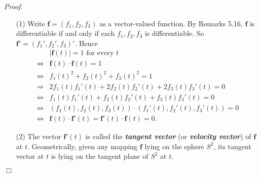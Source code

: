 \documentclass{article}
\begin{document}
\emph{Proof.}
\begin{enumerate}
\item[(1)]
  Write $\mathbf{f} = (f_1, f_2, f_3)$ as a vector-valued function.
  By Remarks 5.16, $\mathbf{f}$ is differentiable if and only if each $f_1, f_2, f_3$
  is differentiable. So $\mathbf{f}' = (f_1', f_2', f_3)'$.
  Hence
  \begin{align*}
    &\text{$|\mathbf{f}(t)| = 1$ for every $t$} \\
    \Longleftrightarrow&
    \mathbf{f}(t) \cdot \mathbf{f}(t) = 1 \\
    \Longleftrightarrow&
    f_1(t)^2 + f_2(t)^2 + f_3(t)^2 = 1 \\
    \Longrightarrow&
    2 f_1(t) f_1'(t) + 2 f_2(t) f_2'(t) + 2 f_3(t) f_3'(t) = 0 \\
    \Longleftrightarrow&
    f_1(t) f_1'(t) + f_2(t) f_2'(t) + f_3(t) f_3'(t) = 0 \\
    \Longleftrightarrow&
    (f_1(t), f_2(t), f_3(t)) \cdot (f_1'(t), f_2'(t), f_3'(t)) = 0 \\
    \Longleftrightarrow&
    \mathbf{f}(t) \cdot \mathbf{f}'(t) = \mathbf{f}'(t) \cdot \mathbf{f}(t) = 0.
  \end{align*}

\item[(2)]
  The vector $\mathbf{f}'(t)$ is called the
  \emph{\textbf{tangent vector}} (or \emph{\textbf{velocity vector}})
  of $\mathbf{f}$ at $t$.
  Geometrically,
  given any mapping $\mathbf{f}$ lying on the sphere $S^2$,
  its tangent vector at $t$ is lying on the tangent plane of $S^2$ at $t$.
\end{enumerate}
$\Box$ \\\\



\end{document}
